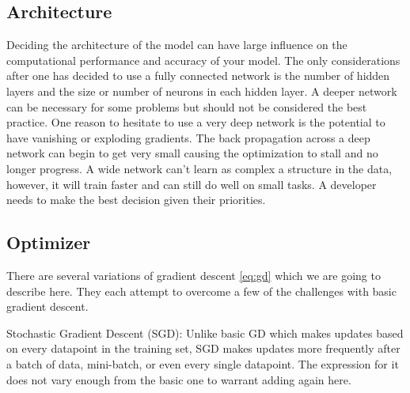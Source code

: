 \documentclass[11pt]{amsart}
\begin{document}
\subsection{Architecture}
Deciding the architecture of the model can have large influence on the computational performance and accuracy of your model.
The only considerations after one has decided to use a fully connected network is the number of hidden layers and the size or number of neurons in each hidden layer.
A deeper network can be necessary for some problems but should not be considered the best practice.
One reason to hesitate to use a very deep network is the potential to have vanishing or exploding gradients.
The back propagation across a deep network can begin to get very small causing the optimization to stall and no longer progress.
A wide network can't learn as complex a structure in the data, however, it will train faster and can still do well on small tasks.
A developer needs to make the best decision given their priorities.

\subsection{Optimizer}
There are several variations of gradient descent \eqref{eq:gd} which we are going to describe here.
They each attempt to overcome a few of the challenges with basic gradient descent.

Stochastic Gradient Descent (SGD):
Unlike basic GD which makes updates based on every datapoint in the training set, SGD makes updates more frequently after a batch of data, mini-batch, or even every single datapoint.
The expression for it does not vary enough from the basic one to warrant adding again here.
\end{document}
